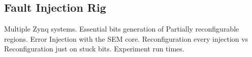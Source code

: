 \subsection{Fault Injection Rig}
Multiple Zynq systems. Essential bits generation of Partially reconfigurable regions.
Error Injection with the SEM core. Reconfiguration every injection vs Reconfiguration just
on stuck bits. Experiment run times.

